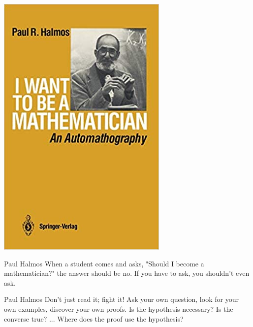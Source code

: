 \begin{boxResource}[lefthand width=5cm, sidebyside]{}
\includegraphics[width=\textwidth]{./img/Halmos_Mathematician}
\tcblower
\begin{boxQuote}{Paul Halmos}
    When a student comes and asks, "Should I become a mathematician?" the answer should be no.
    If you have to ask, you shouldn't even ask.
\end{boxQuote}
    \begin{boxQuote}{Paul Halmos}
    Don't just read it; fight it!
    Ask your own question, look for your own examples, discover your own proofs.
    Is the hypothesis necessary?
    Is the converse true?
    ... Where does the proof use the hypothesis?
    \end{boxQuote}
\end{boxResource}
%
